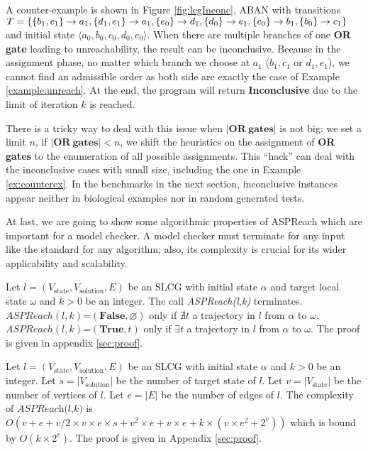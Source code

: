 \begin{example}\label{ex:counterex}
A counter-example is shown in Figure \ref{fig:lcgInconc}, ABAN with transitions $T=\{\acm{b_1,c_1}{a_0}{a_1},\acm{d_1,e_1}{a_0}{a_1},\acm{e_0}{d_0}{d_1},\acm{d_0}{e_0}{e_1},\acm{c_0}{b_0}{b_1},\acm{b_0}{c_0}{c_1}\}$ and initial state $\langle a_0,b_0,c_0,d_0,e_0\rangle$.
When there are multiple branches of one \textbf{OR gate} leading to unreachability, the result can be inconclusive. 
Because in the assignment phase, no matter which branch we choose at $a_1$ ($b_1,c_1$ or $d_1,e_1$), we cannot find an admissible order as both side are exactly the case of Example \ref{example:unreach}.
At the end, the program will return \textbf{Inconclusive} due to the limit of iteration $k$ is reached.
\end{example}

There is a tricky way to deal with this issue when $\mathbf{|OR\ gates|}$ is not big: we set a limit $n$, if $\mathbf{|OR\ gates|}<n$, we shift the heuristics on the assignment of \textbf{OR gates} to the enumeration of all possible assignments.
This ``hack'' can deal with the inconclusive cases with small size, including the one in Example \ref{ex:counterex}.
In the benchmarks in the next section, inconclusive instances appear neither in biological examples nor in random generated tests.


At last, we are going to show some algorithmic properties of ASPReach which are important for a model checker.
A model checker must terminate for any input like the standard for any algorithm; also, its complexity is crucial for its wider applicability and scalability.

\begin{theorem}

    Let $l=(V_{\mathrm{state}}, V_{\mathrm{solution}}, E)$ be an SLCG with initial state $\alpha$ and target local state $\omega$ and $k > 0$ be an integer.
    The call \textit{ASPReach(l,k)} terminates.\\
    $ASPReach(l,k)$=$(\mathbf{False},\varnothing)$ only if $\nexists t$ a trajectory in $l$ from $\alpha$ to $\omega$.\\
    $ASPReach(l,k)$=$(\mathbf{True},t)$ only if $\exists t$ a trajectory in $l$ from $\alpha$ to $\omega$.
    The proof is given in appendix \ref{sec:proof}.
\end{theorem}

\begin{theorem}
    Let $l=(V_{\mathrm{state}}, V_{\mathrm{solution}}, E)$ be an SLCG with initial state $\alpha$ and $k > 0$ be an integer.
    Let $s=|V_{\mathrm{solution}}|$ be the number of target state of $l$.
    Let $v = |V_{\mathrm{state}}|$ be the number of vertices of $l$.
    Let $e=|E|$ be the number of edges of $l$.
    The complexity of $\textit{ASPReach(l,k)}$ is $O(v + e + v/2 \times v \times e \times s + v^{2} \times e + v \times e + k \times (v \times e^{2} + 2^{v}))$ which is bound by $O(k \times 2^{v})$.
    The proof is given in Appendix \ref{sec:proof}.
\end{theorem}

